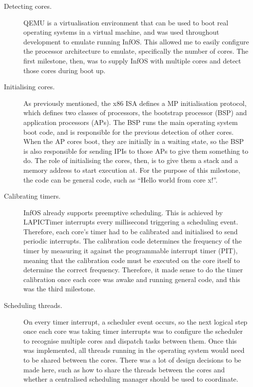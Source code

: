 \documentclass[bsc,frontabs,twoside,singlespacing,parskip,deptreport]{infthesis}     %
\begin{document}
\begin{description}
\item [Detecting cores.] QEMU \cite{qemu} is a virtualisation environment that can be used to boot real operating systems in a virtual machine, and was used throughout development to emulate running InfOS. This allowed me to easily configure the processor architecture to emulate, specifically the number of cores. The first milestone, then, was to supply InfOS with multiple cores and detect those cores during boot up.

\item [Initialising cores.] As previously mentioned, the x86 ISA defines a MP initialisation protocol, which defines two classes of processors, the bootstrap processor (BSP) and application processors (APs). The BSP runs the main operating system boot code, and is responsible for the previous detection of other cores. When the AP cores boot, they are initially in a waiting state, so the BSP is also responsible for sending IPIs to those APs to give them something to do. The role of initialising the cores, then, is to give them a stack and a memory address to start execution at. For the purpose of this milestone, the code can be general code, such as “Hello world from core x!”.

\item[Calibrating timers.] InfOS already supports preemptive scheduling. This is achieved by LAPICTimer interrupts every millisecond triggering a scheduling event. Therefore, each core’s timer had to be calibrated and initialised to send periodic interrupts. The calibration code determines the frequency of the timer by measuring it against the programmable interrupt timer (PIT), meaning that the calibration code must be executed on the core itself to determine the correct frequency. Therefore, it made sense to do the timer calibration once each core was awake and running general code, and this was the third milestone.  

\item[Scheduling threads.] On every timer interrupt, a scheduler event occurs, so the next logical step once each core was taking timer interrupts was to configure the scheduler to recognise multiple cores and dispatch tasks between them. Once this was implemented, all threads running in the operating system would need to be shared between the cores. There was a lot of design decisions to be made here, such as how to share the threads between the cores and whether a centralised scheduling manager should be used to coordinate.
\end{description}
\end{document}
